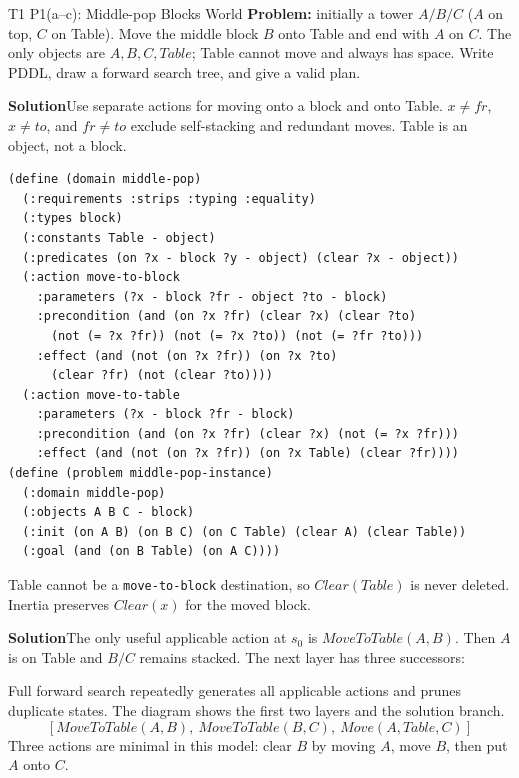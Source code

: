 \documentclass[10pt,a4paper]{article}
\newcommand{\ans}{\par\smallskip\textbf{\color{good}Solution\quad}}
\begin{document}
\begin{question}{T1 P1(a--c): Middle-pop Blocks World}\label{q:t1p1}
\textbf{Problem:} initially a tower $A/B/C$ ($A$ on top, $C$ on Table). Move the middle block $B$ onto Table and end with $A$ on $C$. The only objects are $A,B,C,Table$; Table cannot move and always has space. Write PDDL, draw a forward search tree, and give a valid plan.
\ans Use separate actions for moving onto a block and onto Table. $x\ne fr$, $x\ne to$, and $fr\ne to$ exclude self-stacking and redundant moves. Table is an object, not a block.
\begin{lstlisting}
(define (domain middle-pop)
  (:requirements :strips :typing :equality)
  (:types block)
  (:constants Table - object)
  (:predicates (on ?x - block ?y - object) (clear ?x - object))
  (:action move-to-block
    :parameters (?x - block ?fr - object ?to - block)
    :precondition (and (on ?x ?fr) (clear ?x) (clear ?to)
      (not (= ?x ?fr)) (not (= ?x ?to)) (not (= ?fr ?to)))
    :effect (and (not (on ?x ?fr)) (on ?x ?to)
      (clear ?fr) (not (clear ?to))))
  (:action move-to-table
    :parameters (?x - block ?fr - block)
    :precondition (and (on ?x ?fr) (clear ?x) (not (= ?x ?fr)))
    :effect (and (not (on ?x ?fr)) (on ?x Table) (clear ?fr))))
(define (problem middle-pop-instance)
  (:domain middle-pop)
  (:objects A B C - block)
  (:init (on A B) (on B C) (on C Table) (clear A) (clear Table))
  (:goal (and (on B Table) (on A C))))
\end{lstlisting}
Table cannot be a \texttt{move-to-block} destination, so $Clear(Table)$ is never deleted. Inertia preserves $Clear(x)$ for the moved block.
\ans The only useful applicable action at $s_0$ is $MoveToTable(A,B)$. Then $A$ is on Table and $B/C$ remains stacked. The next layer has three successors:
\begin{center}
\end{center}
Full forward search repeatedly generates all applicable actions and prunes duplicate states. The diagram shows the first two layers and the solution branch.
\[
\boxed{[MoveToTable(A,B),\ MoveToTable(B,C),\ Move(A,Table,C)]}
\]
Three actions are minimal in this model: clear $B$ by moving $A$, move $B$, then put $A$ onto $C$.
\end{question}
\end{document}
